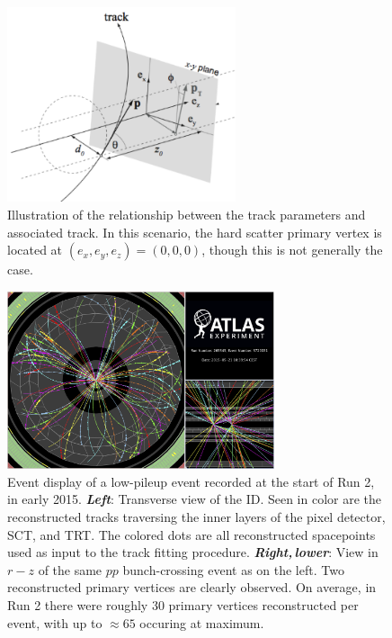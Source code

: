 \begin{figure}[!htb]
    \begin{center}
        \includegraphics[width=0.6\textwidth]{figures/chapter3/perigee_params}
        \caption{
            Illustration of the relationship between the track parameters and associated track.
            In this scenario, the hard scatter primary vertex is located
            at $(e_x, e_y, e_z) = (0,0,0)$, though this is not generally the case.
        }
        \label{fig:track_params}
    \end{center}
\end{figure}

\begin{figure}[!htb]
    \begin{center}
        \includegraphics[width=0.7\textwidth]{figures/chapter3/event_display_tracking_vertexing}
        \caption{
            Event display of a low-pileup event recorded at the start of Run 2, in early 2015.
            \textbf{\textit{Left}}: Transverse view of the ID. Seen in color are the reconstructed tracks traversing
                the inner layers of the pixel detector, SCT, and TRT. The colored dots are all reconstructed
                spacepoints used as input to the track fitting procedure.
            \textbf{\textit{Right,\,lower}}: View in $r-z$ of the same $pp$ bunch-crossing event as on the left.
                Two reconstructed primary vertices are clearly observed.
                On average, in Run 2 there were roughly 30 primary vertices reconstructed per event, with
                up to $\approx65$ occuring at maximum.
        }
        \label{fig:id_event_display}
    \end{center}
\end{figure}
\FloatBarrier
